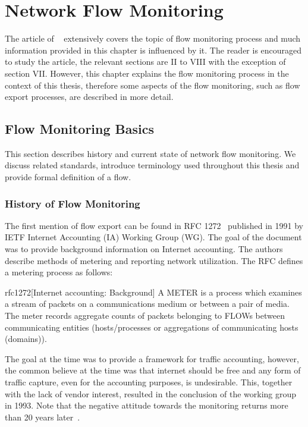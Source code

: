 \chapter{Network Flow Monitoring}


The article of \citeauthor{Hofstede-2014-Flow}~\cite{Hofstede-2014-Flow} extensively covers the topic of flow monitoring process and much information provided in this chapter is influenced by it. The reader is encouraged to study the article, the relevant sections are II to VIII with the exception of section VII. However, this chapter explains the flow monitoring process in the context of this thesis, therefore some aspects of the flow monitoring, such as flow export processes, are described in more detail.

\section{Flow Monitoring Basics}

This section describes history and current state of network flow monitoring. We discuss related standards, introduce terminology used throughout this thesis and provide formal definition of a flow. 

\subsection{History of Flow Monitoring}

The first mention of flow export can be found in RFC 1272~\cite{rfc1272} published in 1991 by IETF Internet Accounting (IA) Working Group (WG). The goal of the document was to provide background information on Internet accounting. The authors describe methods of metering and reporting network utilization. The RFC defines a metering process as follows:

\begin{displaycquote}{rfc1272}[Internet accounting: Background]
A METER is a process which examines a stream of packets on a communications medium or between a pair of media. The meter records  aggregate counts of packets belonging to FLOWs between communicating entities (hosts/processes or aggregations of communicating hosts (domains)).
\end{displaycquote}

The goal at the time was to provide a framework for traffic accounting, however, the common believe at the time was that internet should be free and any form of traffic capture, even for the accounting purposes, is undesirable. This, together with the lack of vendor interest, resulted in the conclusion of the working group in 1993. Note that the negative attitude towards the monitoring returns more than 20 years later~\cite{rfc7258}.

